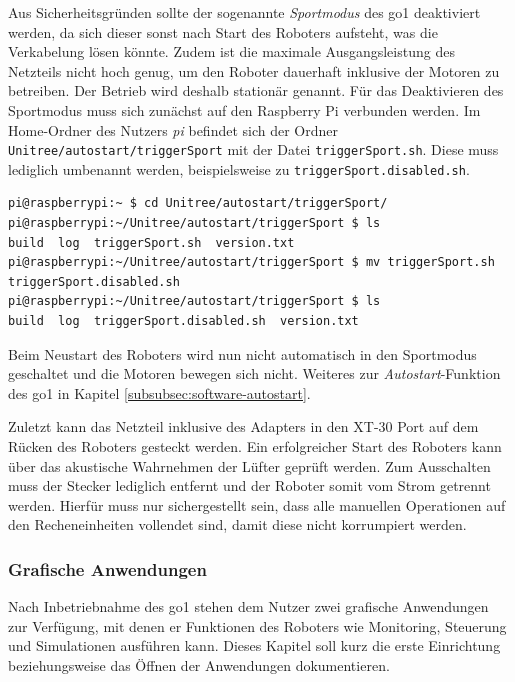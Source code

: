 Aus Sicherheitsgründen sollte der sogenannte \emph{Sportmodus} des \gls{go1} deaktiviert werden, da sich dieser sonst nach
Start des Roboters aufsteht, was die Verkabelung lösen könnte.
Zudem ist die maximale Ausgangsleistung des Netzteils nicht hoch genug, um den Roboter dauerhaft inklusive der Motoren
zu betreiben.
Der Betrieb wird deshalb stationär genannt.
Für das Deaktivieren des Sportmodus muss sich zunächst auf den Raspberry Pi verbunden werden.
Im Home-Ordner des Nutzers \emph{pi} befindet sich der Ordner \texttt{Unitree/autostart/triggerSport} mit der Datei
\texttt{trig\-ger\-Sport.sh}.
Diese muss lediglich umbenannt werden, beispielsweise zu \texttt{trig\-ger\-Sport.dis\-a\-bled.sh}.

\begin{lstlisting}[label=lst:disable-triggersport]
pi@raspberrypi:~ $ cd Unitree/autostart/triggerSport/
pi@raspberrypi:~/Unitree/autostart/triggerSport $ ls
build  log  triggerSport.sh  version.txt
pi@raspberrypi:~/Unitree/autostart/triggerSport $ mv triggerSport.sh triggerSport.disabled.sh
pi@raspberrypi:~/Unitree/autostart/triggerSport $ ls
build  log  triggerSport.disabled.sh  version.txt
\end{lstlisting}

\noindent Beim Neustart des Roboters wird nun nicht automatisch in den Sportmodus geschaltet und die Motoren bewegen sich nicht.
Weiteres zur \emph{Autostart}-Funktion des \gls{go1} in Kapitel \ref{subsubsec:software-autostart}.

Zuletzt kann das Netzteil inklusive des Adapters in den XT-30 Port auf dem Rücken des Roboters gesteckt werden.
Ein erfolgreicher Start des Roboters kann über das akustische Wahrnehmen der Lüfter geprüft werden.
Zum Ausschalten muss der Stecker lediglich entfernt und der Roboter somit vom Strom getrennt werden.
Hierfür muss nur sichergestellt sein, dass alle manuellen Operationen auf den Recheneinheiten vollendet sind, damit diese
nicht korrumpiert werden.

\subsubsection{Grafische Anwendungen}
\label{subsubsec:anwendungen}

Nach Inbetriebnahme des \gls{go1} stehen dem Nutzer zwei grafische Anwendungen zur Verfügung, mit denen er Funktionen
des Roboters wie Monitoring, Steuerung und Simulationen ausführen kann.
Dieses Kapitel soll kurz die erste Einrichtung beziehungsweise das Öffnen der Anwendungen dokumentieren.

